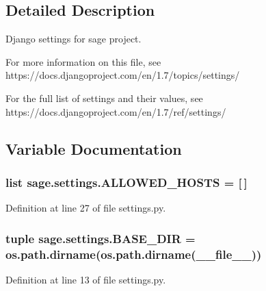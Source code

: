 \subsection{Detailed Description}
\begin{DoxyVerb}Django settings for sage project.

For more information on this file, see
https://docs.djangoproject.com/en/1.7/topics/settings/

For the full list of settings and their values, see
https://docs.djangoproject.com/en/1.7/ref/settings/
\end{DoxyVerb}
 

\subsection{Variable Documentation}
\hypertarget{a00043_a2eb98def792cf73bbc5884024afc5602}{}
\subsubsection[{A\+L\+L\+O\+W\+E\+D\+\_\+\+H\+O\+S\+T\+S}]{\setlength{\rightskip}{0pt plus 5cm}list sage.\+settings.\+A\+L\+L\+O\+W\+E\+D\+\_\+\+H\+O\+S\+T\+S = \mbox{[}$\,$\mbox{]}}\label{a00043_a2eb98def792cf73bbc5884024afc5602}


Definition at line 27 of file settings.\+py.

\hypertarget{a00043_add6d83672b1137d74a06bf1606aecf04}{}
\subsubsection[{B\+A\+S\+E\+\_\+\+D\+I\+R}]{\setlength{\rightskip}{0pt plus 5cm}tuple sage.\+settings.\+B\+A\+S\+E\+\_\+\+D\+I\+R = os.\+path.\+dirname(os.\+path.\+dirname(\+\_\+\+\_\+file\+\_\+\+\_\+))}\label{a00043_add6d83672b1137d74a06bf1606aecf04}


Definition at line 13 of file settings.\+py.

\hypertarget{a00043_a870c10acdd1141ac92340ce3e50ffbbd}{}
